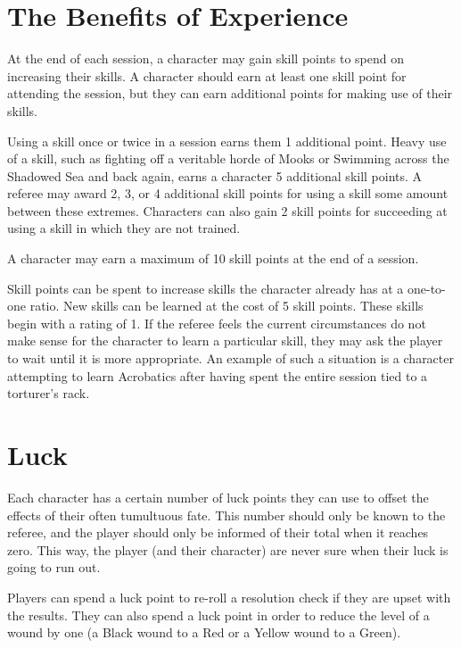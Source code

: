 \documentclass[oneside]{book}
\begin{document}
\begin{multicols}{2}

\section{The Benefits of Experience}

At the end of each session, a character may gain skill points to spend on increasing their skills. A character should earn at least one skill point for attending the session, but they can earn additional points for making use of their skills. 

Using a skill once or twice in a session earns them 1 additional point. Heavy use of a skill, such as fighting off a veritable horde of Mooks or Swimming across the Shadowed Sea and back again, earns a character 5 additional skill points. A referee may award 2, 3, or 4 additional skill points for using a skill some amount between these extremes. Characters can also gain 2 skill points for succeeding at using a skill in which they are not trained.

A character may earn a maximum of 10 skill points at the end of a session. 

Skill points can be spent to increase skills the character already has at a one-to-one ratio. New skills can be learned at the cost of 5 skill points. These skills begin with a rating of 1. If the referee feels the current circumstances do not make sense for the character to learn a particular skill, they may ask the player to wait until it is more appropriate. An example of such a situation is a character attempting to learn Acrobatics after having spent the entire session tied to a torturer's rack. 

\section{Luck}
Each character has a certain number of luck points they can use to offset the effects of their often tumultuous fate. This number should only be known to the referee, and the player should only be informed of their total when it reaches zero. This way, the player (and their character) are never sure when their luck is going to run out. 

Players can spend a luck point to re-roll a resolution check if they are upset with the results. They can also spend a luck point in order to reduce the level of a wound by one (a Black wound to a Red or a Yellow wound to a Green).


\end{multicols}
\end{document}
